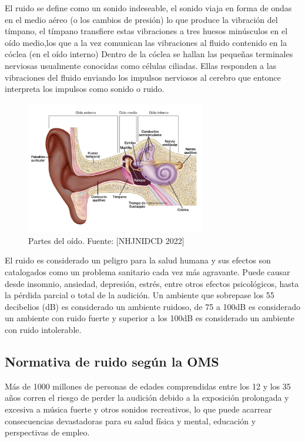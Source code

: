 {{El ruido se define como un sonido indeseable, el sonido viaja en forma de ondas en el medio aéreo (o los cambios de presión) lo que produce la vibración del tímpano, el tímpano transfiere estas vibraciones a tres huesos minúsculos en el oído medio,los que a la vez comunican las vibraciones al fluido contenido en la cóclea (en el oído interno) Dentro de la cóclea se hallan las pequeñas terminales nerviosas usualmente conocidas como células ciliadas. Ellas responden a las vibraciones del fluido enviando los impulsos nerviosos al cerebro que entonce interpreta los impulsos como sonido o ruido.
           \begin{figure}[H]
            \centering
              \includegraphics[width=0.7\textwidth]{../img/Oido.jpg}
              \caption{Partes del oído. Fuente: [NHJNIDCD 2022]}
              \label{fig:oido}
              \end{figure} 
        
 El ruido es considerado un peligro para la salud humana y sus efectos son catalogados como un problema sanitario cada vez más agravante. Puede causar desde insomnio, ansiedad, depresión, estrés, entre otros efectos psicológicos, hasta la pérdida parcial o total de la audición. Un ambiente que sobrepase los 55 decibelios (dB) es considerado un ambiente ruidoso, de 75 a 100dB es considerado un ambiente con ruido fuerte y superior a los 100dB es considerado un ambiente con ruido intolerable.
 
\subsection{Normativa de ruido según la OMS}

Más de 1000 millones de personas de edades comprendidas entre los 12 y los 35 años corren el riesgo de perder la audición debido a la exposición prolongada y excesiva a música fuerte y otros sonidos recreativos, lo que puede acarrear consecuencias devastadoras para su salud física y mental, educación y perspectivas de empleo.

}}
